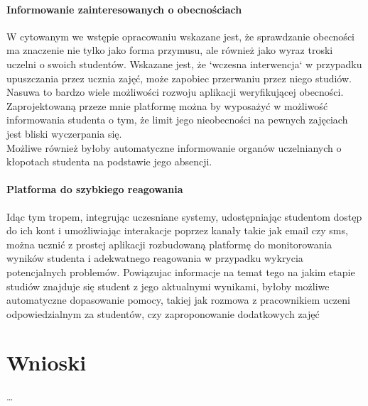 \documentclass[declaration,shortabstract, mgr]{iithesis}
\begin{document}
\subsubsection{Informowanie zainteresowanych o obecnościach}
\indent W cytowanym we wstępie opracowaniu \cite{theory_base} wskazane jest, że sprawdzanie obecności ma znaczenie nie tylko jako forma przymusu, ale również jako wyraz troski uczelni o swoich studentów. Wskazane jest, że `wczesna interwencja` w przypadku upuszczania przez ucznia zajęć, może zapobiec przerwaniu przez niego studiów. Nasuwa to bardzo wiele możliwości rozwoju aplikacji weryfikującej obecności. Zaprojektowaną przeze mnie platformę można by wyposażyć w możliwość informowania studenta o tym, że limit jego nieobecności na pewnych zajęciach jest bliski wyczerpania się. \\
\indent Możliwe również byłoby automatyczne informowanie organów uczelnianych o kłopotach studenta na podstawie jego absencji. \\
\subsubsection{Platforma do szybkiego reagowania}
\indent Idąc tym tropem, integrując uczesniane systemy, udostępniając studentom dostęp do ich kont i umożliwiając interakacje poprzez kanały takie jak email czy sms, można ucznić z prostej aplikacji rozbudowaną platformę do monitorowania wyników studenta i adekwatnego reagowania w przypadku wykrycia potencjalnych problemów. Powiązujac informacje na temat tego na jakim etapie studiów znajduje się student z jego aktualnymi wynikami, byłoby możliwe automatyczne dopasowanie pomocy, takiej jak rozmowa z pracownikiem uczeni odpowiedzialnym za studentów, czy zaproponowanie dodatkowych zajęć

\chapter{Wnioski}

\ldots
\end{document}
